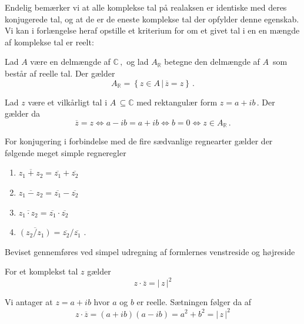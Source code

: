 Endelig bemærker vi at alle komplekse tal på realaksen er identiske med deres konjugerede tal, og at de er de eneste komplekse tal der opfylder denne egenskab. Vi kan i forlængelse heraf opstille et kriterium for om et givet tal i en en mængde af komplekse tal er reelt:\bs
\begin{theorem}[Realkriteriet]\label{tn29_reeltKriterium}
Lad $A$ være en delmængde af $\mathbb C\,,$ og lad $A_{\mathbb R}$ betegne den delmængde af $A\,$ som består af reelle tal.
Der gælder 
$$A_{\mathbb R}=\left\{z\in A\,|\,\overline z=z\right\}\,.$$
\end{theorem}
\begin{bevis}
Lad $z$ være et vilkårligt tal i $A\,\subseteq \mathbb C$ med rektangulær form $z=a+ib\,.$ Der gælder da 
$$\overline z =z \Leftrightarrow a-ib=a+ib \Leftrightarrow b=0 \Leftrightarrow z\in A_{\mathbb R}\,.$$
\end{bevis}
For konjugering i forbindelse med de fire sædvanlige regnearter gælder der følgende meget simple regneregler\bs
\begin{theorem}\label{tn29-regnKonj}
\begin{enumerate}
\item $\overline{z_1+z_2}=\overline{z_1}+\overline{z_2}$
\item $\overline{z_1-z_2}=\overline{z_1}-\overline{z_2}$
\item $\overline{z_1\cdot z_2}=\overline{z_1}\cdot\overline{z_2}$
\item $\overline{(z_2/z_1)}=\overline{z_2}/\overline{z_1}\,\,.$
\end{enumerate}

\end{theorem}
\begin{bevis}
Beviset gennemføres ved simpel udregning af formlernes venstreside og højreside
\end{bevis}

\begin{theorem}
For et komplekst tal $z$ gælder
\begin{equation}
z\cdot \overline z =|\,z\,|^2
\end{equation}
\end{theorem}
\begin{bevis}
Vi antager at $z=a+ib$ hvor $a$ og $b$ er reelle. Sætningen følger da af
$$
z\cdot \overline z = (a+ib)(a-ib)=a^2+b^2=|\,z\,|^2$$
\end{bevis}

